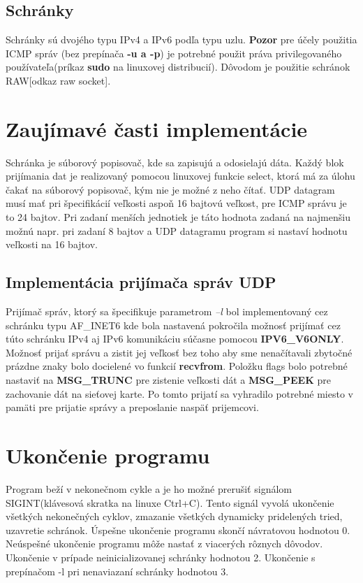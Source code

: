 \documentclass[11pt,a4paper]{report}
\begin{document}
\subsection{Schránky}
Schránky sú dvojého typu IPv4 a IPv6 podľa typu uzlu. \textbf{Pozor} pre účely použitia ICMP správ (bez prepínača \textbf{-u a -p}) je potrebné použit práva privilegovaného používateľa(príkaz \textbf{sudo} na linuxovej distribucií). Dôvodom je použitie schránok RAW[odkaz raw socket].
\section{Zaujímavé časti implementácie}
Schránka je súborový popisovač, kde sa zapisujú a odosielajú dáta. Každý blok prijímania dat je realizovaný pomocou linuxovej funkcie select, ktorá má za úlohu čakať na súborový popisovač, kým nie je možné z neho čítať. UDP datagram musí mať pri špecifikácií veľkosti aspoň 16 bajtovú veľkost, pre ICMP správu je to 24 bajtov. Pri zadaní menších jednotiek je táto hodnota zadaná na najmenšiu možnú napr. pri zadaní 8 bajtov a UDP datagramu program si nastaví hodnotu veľkosti na 16 bajtov.
\subsection{Implementácia prijímača správ UDP}
Prijímač správ, ktorý sa špecifikuje parametrom \emph{--l} bol implementovaný cez schránku typu AF\_INET6 kde bola nastavená pokročila možnosť prijímať cez túto schránku IPv4 aj IPv6 komunikáciu súčasne pomocou \textbf{IPV6\_V6ONLY}. Možnosť prijať správu a zistit jej veľkosť bez toho aby sme nenačítavali zbytočné prázdne znaky bolo docielené vo funkcií \textbf{recvfrom}. Položku flags bolo potrebné nastaviť na \textbf{MSG_TRUNC} pre zistenie veľkosti dát a \textbf{MSG_PEEK} pre zachovanie dát na sieťovej karte. Po tomto prijatí sa vyhradilo potrebné miesto v pamäti pre prijatie správy a preposlanie naspäť prijemcovi.
\section{Ukončenie programu}
Program beží v nekonečnom cykle a je ho možné prerušiť signálom SIGINT(klávesová skratka na linuxe Ctrl+C). Tento signál vyvolá ukončenie všetkých nekonečných cyklov, zmazanie všetkých dynamicky pridelených tried, uzavretie schránok.
Úspešne ukončenie programu skončí návratovou hodnotou 0.
Neúspešné ukončenie programu môže nastať z viacerých rôznych dôvodov. Ukončenie v prípade neinicializovanej schránky hodnotou 2.
Ukončenie s prepínačom -l pri nenaviazaní schránky hodnotou 3.
\end{document}
